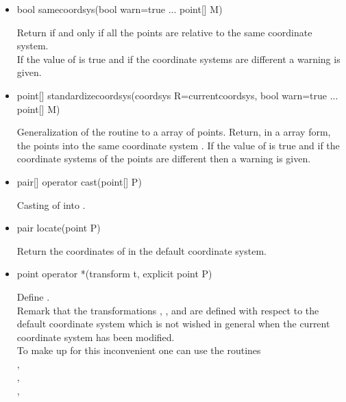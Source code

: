\documentclass[pdftex]{article}
\begin{document}
\begin{itemize}
\item {}
  \begin{Vcolor}
    bool samecoordsys(bool warn=true ... point[] M)
  \end{Vcolor}
  Return  if and only if all the points are relative to the
  same coordinate system.\\
  If the value of  is true and if the coordinate systems are
  different a warning is given.
\item {}
  \begin{Vcolor}
    point[] standardizecoordsys(coordsys R=currentcoordsys,
    bool warn=true ... point[] M)
  \end{Vcolor}
  Generalization of the routine  to a array of
  points. Return, in a array form,  the points into the same
  coordinate system . If the value of  is true and if the
  coordinate systems of the points are different then a warning is given.
\item
  \begin{Vcolor}
    pair[] operator cast(point[] P)
  \end{Vcolor}
  Casting of  into .
\item {}
  \begin{Vcolor}
    pair locate(point P)
  \end{Vcolor}
  Return the coordinates of  in the default coordinate system.
\item {}
  \begin{Vcolor}
    point operator *(transform t, explicit point P)
  \end{Vcolor}
  Define .\\
  Remark that the transformations  , ,
   and  are defined with respect to the
  default coordinate system which is not wished in general when the current
  coordinate system has been modified.\\
  To make up for this inconvenient one can use the routines\hfill\\
  ,\\
  ,\\
  ,\\

\end{itemize}
\end{document}
